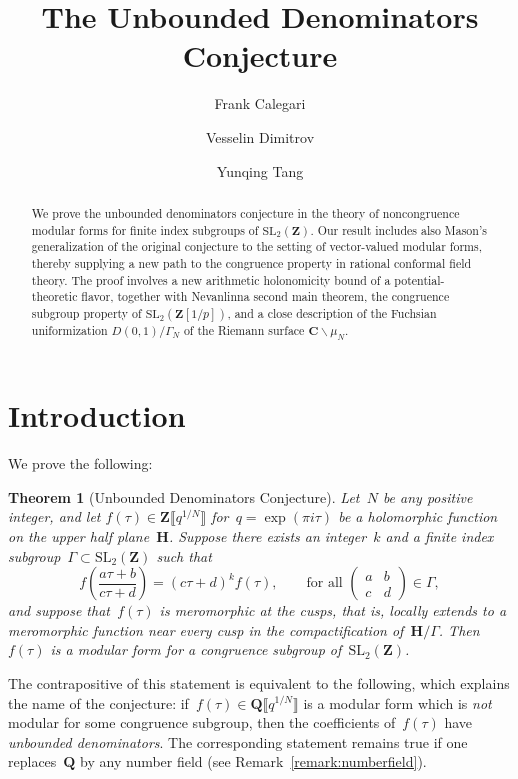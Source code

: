 \documentclass[10pt]{amsart}
\title{The Unbounded Denominators Conjecture}
\author[F. Calegari]{Frank Calegari}
\author[V. Dimitrov]{Vesselin Dimitrov}
\author[Y. Tang]{Yunqing Tang}
\renewcommand\setminus{\smallsetminus}
\def\Z{\mathbf{Z}}
\def\Q{\mathbf{Q}}
\newtheorem{theorem}[subsubsection]{Theorem}
\theoremstyle{remark}
\numberwithin{equation}{subsection}
\def\C{\mathbf{C}}
\def\SL{\mathrm{SL}}
\def\H{\mathbf{H}}
\begin{document}
\begin{abstract}
We prove the unbounded denominators conjecture in the theory of noncongruence modular forms for finite index subgroups of $\SL_2(\Z)$. Our result includes also Mason's generalization of the original conjecture to the setting of vector-valued modular forms, thereby supplying a new path to the congruence property in rational conformal field theory. The proof involves a new arithmetic holonomicity bound of a potential-theoretic flavor, together with Nevanlinna second main theorem, the congruence subgroup property of $\SL_2(\Z[1/p])$, and a close description of the Fuchsian uniformization $D(0,1)/\Gamma_N$ of the Riemann surface $\C \setminus \mu_N$. 
\end{abstract}

\maketitle

{\footnotesize
\tableofcontents
}



\section{Introduction}

We prove the following:

\begin{theorem}[Unbounded Denominators Conjecture] \label{theorem:main}
Let~$N$ be any positive integer, and let
$f(\tau) \in \Z  \llbracket q^{1/N} \rrbracket$ for~$q = \exp(\pi i \tau)$ be a holomorphic
function on the upper half plane~$\H$. Suppose there exists an integer~$k$ and a finite index
 subgroup~$\Gamma \subset \SL_2(\Z)$ such that
$$f \left( \frac{a \tau + b}{c \tau + d}\right) = (c \tau + d)^k f(\tau), \quad \quad
\textrm{for all } \left( \begin{matrix} a & b \\ c & d \end{matrix} \right) \in \Gamma,$$
and suppose that~$f(\tau)$ is meromorphic at the cusps,
that is, locally extends to a meromorphic function near every cusp in the compactification
of~$\H/\Gamma$.
Then~$f(\tau)$ is a modular form for a congruence subgroup of~$\SL_2(\Z)$.
\end{theorem}

The contrapositive of this statement is equivalent to the following, which explains the name of the conjecture: if~$f(\tau) \in \Q \llbracket q^{1/N} \rrbracket$ is a  
modular form which is \emph{not}
modular for some congruence subgroup, then the coefficients of~$f(\tau)$ have \emph{unbounded denominators}.
The corresponding statement remains true if one replaces~$\Q$ by any number field (see Remark~\ref{remark:numberfield}).
\end{document}
